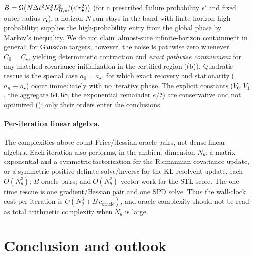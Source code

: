 $B=\Omega\bigl(N\Delta t^2N_\theta^2L_{H,\star}^2/(\epsilon'r_\bullet^2)\bigr)$ (for a prescribed failure
probability $\epsilon'$ and fixed outer radius $r_\bullet$), a horizon-$N$ run stays in the band with
finite-horizon high probability;  supplies the high-probability entry from
the global phase by Markov's inequality. We do not claim almost-sure infinite-horizon containment in general; for Gaussian
targets, however, the noise is pathwise zero whenever $C_0=C_\star$, yielding deterministic contraction
and \emph{exact pathwise containment} for any matched-covariance initialization in the certified region
((b)). Quadratic rescue is the special case $a_0=a_\star$, for which exact
recovery and stationarity ($a_n\equiv a_\star$) occur immediately with no iterative phase. The explicit constants
($V_0,V_1$, the aggregate $64,68$, the exponential remainder $e/2$) are conservative and not
optimized (); only their orders enter the conclusions.

\paragraph{Per-iteration linear algebra.}
The complexities above count Price/Hessian oracle pairs, not dense linear algebra. Each iteration
also performs, in the ambient dimension $N_\theta$: a matrix exponential and a symmetric
factorization for the Riemannian covariance update, or a symmetric positive-definite solve/inverse
for the KL resolvent update, each $O(N_\theta^3)$; $B$ oracle pairs; and $O(N_\theta^2)$ vector work
for the STL score. The one-time rescue is one gradient/Hessian pair and one SPD solve. Thus the
wall-clock cost per iteration is $O(N_\theta^3+B\,c_{\mathrm{oracle}})$, and oracle complexity should
not be read as total arithmetic complexity when $N_\theta$ is large.

\section{Conclusion and outlook}
\label{sec:conclusion}

